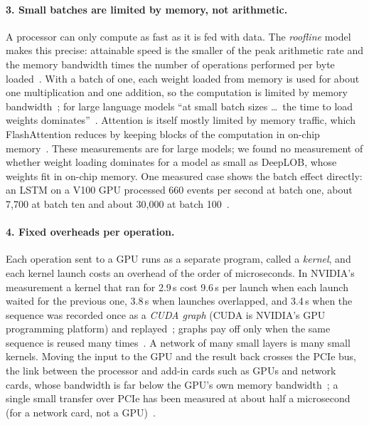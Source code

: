 \paragraph{3. Small batches are limited by memory, not arithmetic.} A processor can only compute as fast as it is fed
with data. The \emph{roofline} model makes this precise: attainable speed is the smaller of the peak arithmetic rate
and the memory bandwidth times the number of operations performed per byte loaded~\citep{williams2009roofline}. With a
batch of one, each weight loaded from memory is used for about one multiplication and one addition, so the
computation is limited by memory bandwidth~\citep{kim2023fullstack}; for large language models ``at small batch sizes
\ldots\ the time to load weights dominates''~\citep{pope2023scaling}. Attention is itself mostly limited by memory
traffic, which FlashAttention reduces by keeping blocks of the computation in on-chip memory~\citep{dao2022flashattention}.
These measurements are for large models; we found no measurement of whether weight loading dominates for a model as
small as DeepLOB, whose weights fit in on-chip memory. One measured case shows the batch effect directly: an LSTM on a
V100 GPU processed 660 events per second at batch one, about 7,700 at batch ten and about 30,000 at batch
100~\citep{khoda2023rnn}.

\paragraph{4. Fixed overheads per operation.} Each operation sent to a GPU runs as a separate program, called a
\emph{kernel}, and each kernel launch costs an overhead of the order of microseconds. In NVIDIA's measurement a kernel that ran for 2.9\,\textmu s cost 9.6\,\textmu s per launch when each
launch waited for the previous one, 3.8\,\textmu s when launches overlapped, and 3.4\,\textmu s when the sequence was
recorded once as a \emph{CUDA graph} (CUDA is NVIDIA's GPU programming platform) and replayed~\citep{nvidia_cudagraphs_blog}; graphs pay off only when the same
sequence is reused many times~\citep{nvidia_cuda_guide}. A network of many small layers is many small kernels. Moving
the input to the GPU and the result back crosses the PCIe bus, the link between the processor and add-in cards such
as GPUs and network cards, whose bandwidth is far below the GPU's own memory
bandwidth~\citep{nvidia_cuda_bpg}; a single small transfer over PCIe has been measured at about half a microsecond
(for a network card, not a GPU)~\citep{neugebauer2018pcie}.

